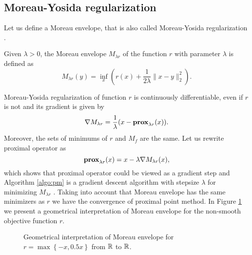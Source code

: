 \subsection{Moreau-Yosida regularization}\label{sec:basics_moreau-yosida}
Let us define a Moreau envelope, that is also called Moreau-Yosida regularization \cite{moreau1962fonctions, yosida2012functional}.

\begin{definition}
Given $\lambda>0$, the Moreau envelope $M_{\lambda r}$ of the function $r$ with parameter $\lambda$ is defined as 
\begin{equation}\label{eq:M-Y}
M_{\lambda r}(y) = \inf_x\left(r(x) + \frac{1}{2\lambda}\|x-y\|_2^2\right).
\end{equation}
\end{definition}

Moreau-Yosida regularization of function $r$ is continuously differentiable, even if $r$ is not \cite[Fact $17.17$]{yamada2011minimizing} and its gradient is given by
\begin{equation}\label{eq:M-Y_grad}
\nabla M_{\lambda r} = \frac{1}{\lambda}(x-\mathbf{prox}_{\lambda r}(x)).
\end{equation}
Moreover, the sets of minimums of $r$ and $M_f$ are the same. Let us rewrite proximal operator as
$$
\mathbf{prox}_{\lambda r}(x) = x - \lambda\nabla M_{\lambda r}(x),
$$
which shows that proximal operator could be viewed as a gradient step and Algorithm \ref{algo:pm} is a gradient descent algorithm with stepsize $\lambda$ for minimizing $M_{\lambda r}$ \cite{rockafellar1976monotone}. Taking into account that Moreau envelope has the same minimizers as $r$ we have the convergence of proximal point method. In Figure \ref{fig:M-Y} we present a geometrical interpretation of Moreau envelope for the non-smooth objective function $r$.

\begin{figure}[H]
    \centering
    
    \caption{Geometrical interpretation of Moreau envelope for $r = \max\left\{-x, 0.5x\right\}$ from $\mathbb{R}$ to $\mathbb{R}$.}
    \label{fig:M-Y}
\end{figure}


